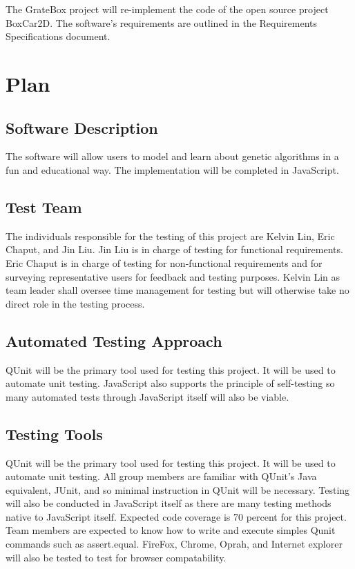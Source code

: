 \documentclass[12pt, titlepage]{article}
\begin{document}
The GrateBox project will re-implement the code of the open source project 
BoxCar2D. The software's requirements are outlined in the Requirements 
Specifications document.

\section{Plan}
	
\subsection{Software Description}

The software will allow users to model and learn about genetic algorithms in a 
fun and educational way. The implementation will be completed in JavaScript.

\subsection{Test Team}

The individuals responsible for the testing of this project are  Kelvin Lin, 
Eric Chaput, and  Jin Liu. Jin Liu is in charge of testing for functional 
requirements. Eric Chaput is in charge of testing for non-functional 
requirements and for surveying representative users for feedback and testing 
purposes. Kelvin Lin as team leader shall oversee time management for testing 
but will otherwise take no direct role in the testing process.

\subsection{Automated Testing Approach}

QUnit will be the primary tool used for testing this project. It will be used to 
automate unit testing. JavaScript also supports the principle of self-testing so 
many automated tests through JavaScript itself will also be viable.

\subsection{Testing Tools}

QUnit will be the primary tool used for testing this project. It will be used to 
automate unit testing. All group members are familiar with QUnit's Java 
equivalent, JUnit, and so minimal instruction in QUnit will be necessary. 
Testing will also be conducted in JavaScript itself as there are many testing 
methods native to JavaScript itself. Expected code coverage is 70 percent for this project. Team members are expected to know how to write and execute simples Qunit commands such as assert.equal. FireFox, Chrome, Oprah, and Internet explorer will also be tested to test for browser compatability.
\end{document}
